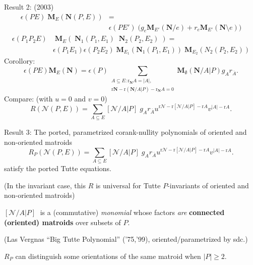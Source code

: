 \documentclass[%
  slidesonly,%
  semlayer,%
  amsmath
  ]{seminar}                                  %
\newcommand{\rank}{{\mbox{r}}}%
\newcommand{\Rank}{{\mbox{r}}}%
\newcommand{\Card}[1]{\ensuremath{{\left|#1\right|}}}
\newcommand{\ext}[1]{\ensuremath{\mathbf{#1}}}
\newcommand{\scomp}[1]{\ensuremath{\overline{#1}}}
\newcommand{\MVAR}[1]{{[#1]\;}}
\begin{document}
\begin{slide}
Result 2: (2003)
\begin{align*}
   \epsilon(PE)\;\mathbf{M}_E(\mathbf{N}(P,E))&=\\
&\epsilon(PE')\;\big(g_e\mathbf{M}_{E'}(\mathbf{N}/e) 
                + r_e\mathbf{M}_{E'}(\mathbf{N}\setminus e)\big)
\end{align*}
\begin{align*}
   \epsilon(P_1P_2E)&\;\mathbf{M}_E(\;\mathbf{N}_1(P_1,E_1)\;\;\mathbf{N}_2(P_2,E_2)\;)
   =\\
&\epsilon(P_1E_1)\epsilon(P_2E_2)\;
   \mathbf{M}_{E_1}(\mathbf{N}_1(P_1,E_1))\;\mathbf{M}_{E_2}({N}_2(P_2,E_2))
\end{align*}
Corollory:
\begin{equation}
\label{MESubsetSum}
\epsilon(PE)\ext{M}_E(\ext{N})=\epsilon(P)\sum_
             {\begin{array}{c}
                A\subseteq E:
	\rank_{\ext{N}}{A}=\Card{A},\\
	\rank{\ext{N}}-\rank{(\ext{N}/A|P)}-
        \rank_{\ext{N}}{A}=0
               \end{array}}
    \ext{M}_\emptyset(\ext{N}/A|P) g_Ar_{\scomp{A}}.
\end{equation}
Compare: (with $u=0$ and $v=0$)
\[
R(\mathcal{N}(P,E))=\sum_{A\subseteq E}
	\MVAR{\mathcal{N}/A|P}g_Ar_{\scomp{A}}
	u^{\Rank{\mathcal{N}}-\Rank{[\mathcal{N}/A|P]}-\Rank{A}}
	v^{\Card{A}-\Rank{A}}.
\]

\end{slide}

\begin{slide}
Result 3:  The ported, parametrized corank-nullity polynomials
of oriented and non-oriented matroids 
\[
R_P(\mathcal{N}(P,E))=\sum_{A\subseteq E}
	\MVAR{\mathcal{N}/A|P}g_Ar_{\scomp{A}}
	u^{\Rank{\mathcal{N}}-\Rank{[\mathcal{N}/A|P]}-\Rank{A}}
	v^{\Card{A}-\Rank{A}}.
\]
satisfy the ported Tutte equations.

(In the invariant case, this $R$ is universal for Tutte $P$-invariants
of oriented and non-oriented matroids)

$\MVAR{\mathcal{N}/A|P}$ is a (commutative) \textit{monomial} whose factors 
\textit{are} \textbf{connected (oriented) matroids} over subsets of $P$.

(Las Vergnas ``Big Tutte Polynomial'' ('75,'99), oriented/parametrized by sdc.)

$R_P$ can distinguish some orientations of the same matroid when
$|P|\ge 2$.

\end{slide}
\end{document}
